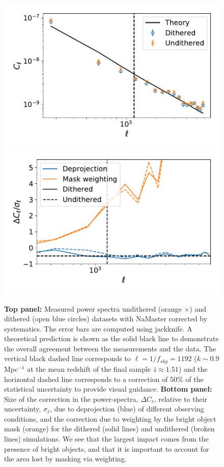 \documentclass[\docopts]{\docclass}
\begin{document}
\begin{figure}
\centering
\includegraphics[width=0.9\columnwidth]{Cl_results_2019_comp}
\includegraphics[width=0.9\columnwidth]{systematics_comp_abs}
\caption{{\bf Top panel:} Measured power spectra undithered (orange $\times$) and dithered (open blue circles) datasets with NaMaster corrected by systematics. The error bars are computed using jackknife. A theoretical prediction is shown as the solid black line to demonstrate the overall agreement between the measurements and the data. The vertical black dashed line corresponds to $\ell = 1/f_{sky}=1192$ ($k \sim 0.9$ Mpc$^{-1}$ at the mean redshift of the final sample $\bar{z} \approx 1.51$) and the horizontal dashed line corresponds to a correction of 50\% of the statistical uncertainty to provide visual guidance. {\bf Bottom panel:} Size of the correction in the power-spectra, $\Delta C_{\ell}$, relative to their uncertainty, $\sigma_{\ell}$, due to deprojection (blue) of different observing conditions, and the correction due to weighting by the bright object mask (orange) for the dithered (solid lines) and undithered (broken lines) simulations. We see that the largest impact comes from the presence of bright objects, and that it is important to account for the area lost by masking via weighting.}
\label{fig:power_spectra}
\end{figure}
\end{document}
